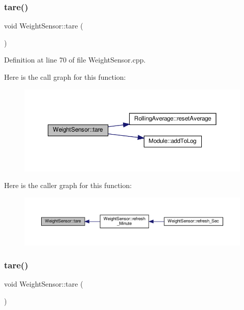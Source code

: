 \subsubsection{\texorpdfstring{tare()}{tare()}\hspace{0.1cm}{\footnotesize\ttfamily [1/2]}}
{\footnotesize\ttfamily void Weight\+Sensor\+::tare (\begin{DoxyParamCaption}{ }\end{DoxyParamCaption})\hspace{0.3cm}{\ttfamily [protected]}}



Definition at line 70 of file Weight\+Sensor.\+cpp.

Here is the call graph for this function\+:
\nopagebreak
\begin{figure}[H]
\begin{center}
\leavevmode
\includegraphics[width=350pt]{class_weight_sensor_a02fe54254ed51deefc115fad34053061_cgraph}
\end{center}
\end{figure}
Here is the caller graph for this function\+:
\nopagebreak
\begin{figure}[H]
\begin{center}
\leavevmode
\includegraphics[width=350pt]{class_weight_sensor_a02fe54254ed51deefc115fad34053061_icgraph}
\end{center}
\end{figure}
\mbox{\label{class_weight_sensor_a02fe54254ed51deefc115fad34053061}} 
\subsubsection{\texorpdfstring{tare()}{tare()}\hspace{0.1cm}{\footnotesize\ttfamily [2/2]}}
{\footnotesize\ttfamily void Weight\+Sensor\+::tare (\begin{DoxyParamCaption}{ }\end{DoxyParamCaption})\hspace{0.3cm}{\ttfamily [protected]}}

